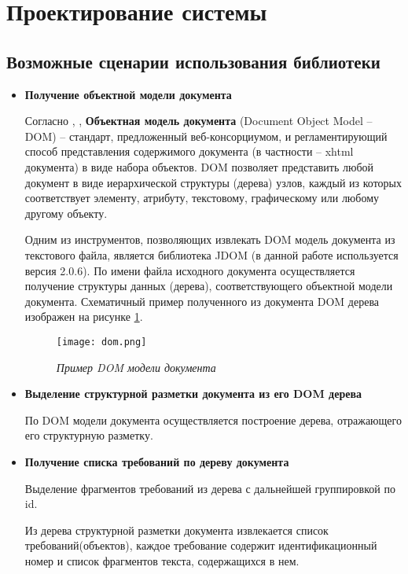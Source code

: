 \section{Проектирование системы}
\label{sec:Chapter3} 
\subsection{Возможные сценарии использования библиотеки}
\begin{itemize}
\item \textbf{Получение объектной модели документа}

Согласно \cite{book:DOM}, \cite{book:JDOM}, \textbf{Объектная модель документа} (Document Object Model – DOM) – стандарт, предложенный веб-консорциумом, и регламентирующий способ представления содержимого документа (в частности – xhtml документа) в виде набора объектов. DOM позволяет представить любой документ в виде иерархической структуры (дерева) узлов, каждый из которых соответствует элементу, атрибуту, текстовому, графическому или любому другому объекту.

Одним из инструментов, позволяющих извлекать DOM модель документа из текстового файла, является библиотека JDOM (в данной работе используется версия 2.0.6).
По имени файла исходного документа осуществляется получение структуры данных (дерева), соответствующего объектной модели документа. Схематичный пример полученного из документа DOM дерева изображен на рисунке \ref{pr:image4}.

\begin{figure}[h]
\begin{center}
\texttt{[image: dom.png]}
\caption{\emph{Пример DOM модели документа}}
\label{pr:image4}
\end{center}
\end{figure}

\item \textbf{Выделение структурной разметки документа из его DOM дерева}

По DOM модели документа осуществляется построение дерева, отражающего его структурную разметку.

\item \textbf{Получение списка требований по дереву документа}

Выделение фрагментов требований из дерева с дальнейшей группировкой по id. 

Из дерева структурной разметки документа извлекается список требований(объектов), каждое требование содержит идентификационный номер и список фрагментов текста, содержащихся в нем.


\end{itemize}

